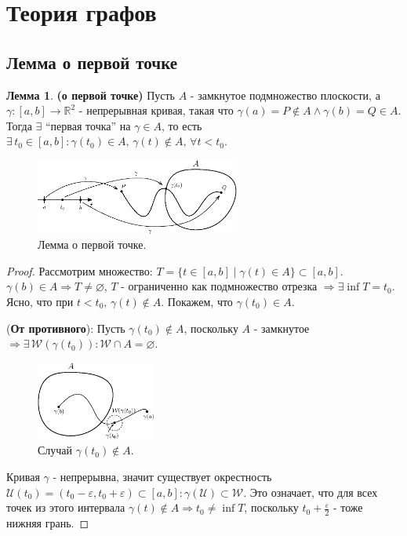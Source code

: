 \documentclass[12pt]{article}
\newcommand{\MR}{\mathbb{R}}
\newcommand{\MU}{\mathcal{U}}
\newcommand{\MW}{\mathcal{W}}
\newcommand{\VN}{\varnothing}
\newcommand{\VE}{\varepsilon}
\theoremstyle{definition}
\newtheorem{lemma}{Лемма}
\begin{document}

\section*{Теория графов}
\subsection*{Лемма о первой точке}
\begin{lemma}\textbf{(о первой точке)}
	Пусть $A$ - замкнутое подмножество плоскости, а $\gamma \colon [a,b] \to \MR^2$ - непрерывная кривая, такая что $\gamma(a) = P \notin A \wedge \gamma(b) = Q \in A$. Тогда $\exists$ ``первая точка'' на $\gamma \in A$, то есть $\exists \, t_0 \in [a,b] \colon \gamma(t_0) \in A, \, \gamma(t) \notin A, \, \forall t < t_0$. 
\end{lemma}
\begin{figure}[H]
	\centering
	\includegraphics[width=0.6\textwidth]{GATL2_1.eps}
	\caption{Лемма о первой точке.}
	\label{2_1}
\end{figure}
\begin{proof}
	Рассмотрим множество: $T = \{t \in [a,b]\mid \gamma(t) \in A\} \subset [a,b]$. $\gamma(b) \in A \Rightarrow T \neq \VN$, $T$ - ограниченно как подмножество отрезка $\Rightarrow \exists \inf{T} = t_0$. Ясно, что при $t < t_0, \, \gamma(t) \not\in A$. Покажем, что $\gamma(t_0) \in A$.  
	
	(\textbf{От противного}): Пусть $\gamma(t_0) \not\in A$, поскольку $A$ - замкнутое $\Rightarrow \exists \, \MW(\gamma(t_0)) \colon \MW \cap A = \VN$.
	\begin{figure}[H]
		\centering
		\includegraphics[width=0.35\textwidth]{GATL2_2.eps}
		\caption{Случай $\gamma(t_0) \notin A$.}
		\label{2_2}
	\end{figure}
	Кривая $\gamma$ - непрерывна, значит существует окрестность $\MU(t_0) = (t_0 - \VE, t_0 + \VE) \subset [a,b] \colon \gamma(\MU)\subset \MW$. Это означает, что для всех точек из этого интервала $\gamma(t) \not\in A \Rightarrow t_0 \neq \inf{T}$, поскольку $t_0 + \tfrac{\VE}{2}$ - тоже нижняя грань.
\end{proof}
\end{document}
